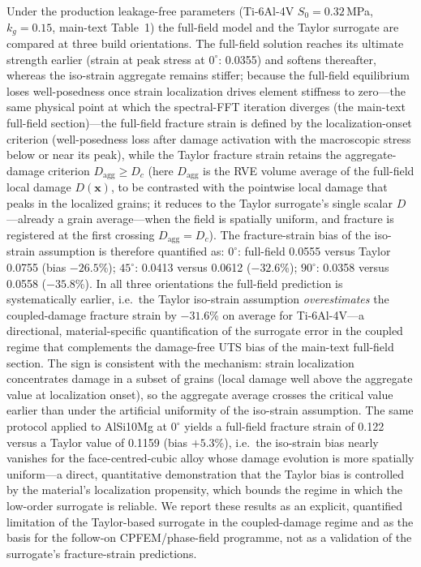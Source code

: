 \documentclass[11pt,a4paper,twocolumn]{article}
\providecommand{\ang}[1]{\ensuremath{#1^{\circ}}}
\begin{document}
Under the production leakage-free parameters (Ti-6Al-4V $S_0 = 0.32$\,MPa, $k_g = 0.15$, main-text Table~1) the full-field model and the Taylor surrogate are compared at three build orientations. The full-field solution reaches its ultimate strength earlier (strain at peak stress at $\ang{0}$: 0.0355) and softens thereafter, whereas the iso-strain aggregate remains stiffer; because the full-field equilibrium loses well-posedness once strain localization drives element stiffness to zero---the same physical point at which the spectral-FFT iteration diverges (the main-text full-field section)---the full-field fracture strain is defined by the localization-onset criterion (well-posedness loss after damage activation with the macroscopic stress below or near its peak), while the Taylor fracture strain retains the aggregate-damage criterion $D_{\mathrm{agg}} \ge D_c$ (here $D_{\mathrm{agg}}$ is the RVE volume average of the full-field local damage $D(\mathbf{x})$, to be contrasted with the pointwise local damage that peaks in the localized grains; it reduces to the Taylor surrogate's single scalar $D$---already a grain average---when the field is spatially uniform, and fracture is registered at the first crossing $D_{\mathrm{agg}}=D_c$). The fracture-strain bias of the iso-strain assumption is therefore quantified as: $\ang{0}$: full-field 0.0555 versus Taylor 0.0755 (bias $-26.5$\%); $\ang{45}$: 0.0413 versus 0.0612 ($-32.6$\%); $\ang{90}$: 0.0358 versus 0.0558 ($-35.8$\%). In all three orientations the full-field prediction is systematically earlier, i.e.\ the Taylor iso-strain assumption \emph{overestimates} the coupled-damage fracture strain by $-31.6$\% on average for Ti-6Al-4V---a directional, material-specific quantification of the surrogate error in the coupled regime that complements the damage-free UTS bias of the main-text full-field section. The sign is consistent with the mechanism: strain localization concentrates damage in a subset of grains (local damage well above the aggregate value at localization onset), so the aggregate average crosses the critical value earlier than under the artificial uniformity of the iso-strain assumption. The same protocol applied to AlSi10Mg at $\ang{0}$ yields a full-field fracture strain of 0.122 versus a Taylor value of 0.1159 (bias $+5.3$\%), i.e.\ the iso-strain bias nearly vanishes for the face-centred-cubic alloy whose damage evolution is more spatially uniform---a direct, quantitative demonstration that the Taylor bias is controlled by the material's localization propensity, which bounds the regime in which the low-order surrogate is reliable. We report these results as an explicit, quantified limitation of the Taylor-based surrogate in the coupled-damage regime and as the basis for the follow-on CPFEM/phase-field programme, not as a validation of the surrogate's fracture-strain predictions.
\end{document}
